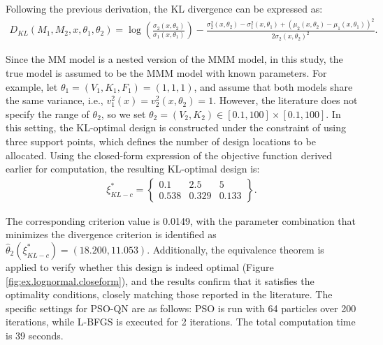 Following the previous derivation, the KL divergence can be expressed as:
{\small
\begin{align*}
D_{KL}(M_1,M_2,x,\theta_1,\theta_2)=\log \left(\frac{\sigma_2(x,\theta_2)}{\sigma_1(x,\theta_1)}\right)-\frac{\sigma_2^2(x,\theta_2)-\sigma_1^2(x,\theta_1)+\left(\mu_2(x,\theta_2)-\mu_1(x,\theta_1)\right)^2}{2\sigma_2(x,\theta_2)^2}.
\end{align*}
}

\hspace*{8mm} Since the MM model is a nested version of the MMM model, in this study, the true model is assumed to be the MMM model with known parameters. For example, let $\theta_1=(V_1,K_1,F_1)=(1,1,1)$, and assume that both models share the same variance, i.e., $v^2_1(x)=v^2_2(x,\theta_2)=1$. However, the literature does not specify the range of $\theta_2$, so we set $\theta_2=(V_2,K_2) \in [0.1,100] \times [0.1,100]$. In this setting, the KL-optimal design is constructed under the constraint of using three support points, which defines the number of design locations to be allocated. Using the closed-form expression of the objective function derived earlier for computation, the resulting KL-optimal design is:
\begin{align*}
\xi^*_{KL-c} = \left\{\begin{array}{ccc}
0.1 & 2.5 & 5 \\
0.538 & 0.329 & 0.133
\end{array}\right\}.
\end{align*}

\hspace*{8mm} The corresponding criterion value is 0.0149, with the parameter combination that minimizes the divergence criterion is identified as $\hat{\theta}_2(\xi^*_{KL-c})=(18.200,11.053)$. Additionally, the equivalence theorem is applied to verify whether this design is indeed optimal (Figure \ref{fig:ex.lognormal.closeform}), and the results confirm that it satisfies the optimality conditions, closely matching those reported in the literature. The specific settings for PSO-QN are as follows: PSO is run with 64 particles over 200 iterations, while L-BFGS is executed for 2 iterations. The total computation time is 39 seconds.

